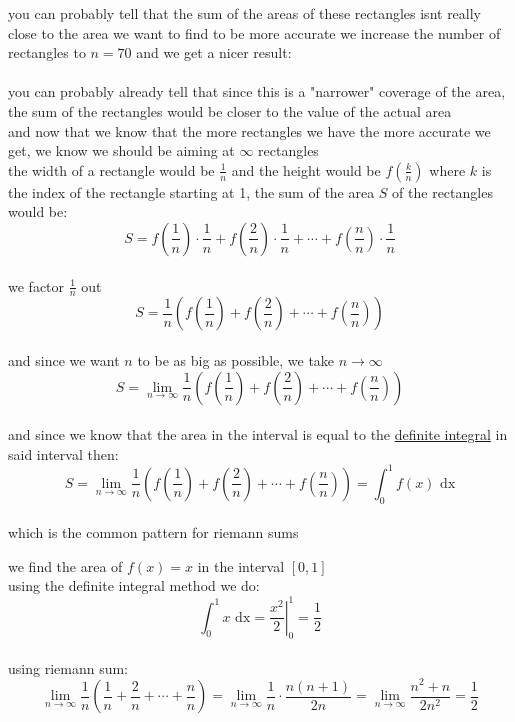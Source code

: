 \documentclass[a4paper,12pt]{article}
\newcommand{\?}{\stackrel{?}{=}}
\begin{document}
you can probably tell that the sum of the areas of these rectangles isnt really close to the area we want to find to be more accurate we increase the number of rectangles to \(n=70\) and we get a nicer result:\\[0pt]

\\[0pt]

you can probably already tell that since this is a "narrower" coverage of the area, the sum of the rectangles would be closer to the value of the actual area\\[0pt]
and now that we know that the more rectangles we have the more accurate we get, we know we should be aiming at \(\infty\) rectangles\\[0pt]
the width of a rectangle would be \(\frac{1}{n}\) and the height would be \(f\left(\frac{k}{n}\right)\) where \(k\) is the index of the rectangle starting at 1, the sum of the area \(S\) of the rectangles would be:\\[0pt]
\[
  S = f\left(\frac{1}{n}\right) \cdot \frac{1}{n} + f\left(\frac{2}{n}\right) \cdot \frac{1}{n} + \cdots + f\left(\frac{n}{n}\right) \cdot \frac{1}{n}
\]\\[0pt]
we factor \(\frac{1}{n}\) out\\[0pt]
\[
  S = \frac{1}{n} \left(f\left(\frac{1}{n}\right) + f\left(\frac{2}{n}\right) + \cdots + f\left(\frac{n}{n}\right)\right)
\]\\[0pt]
and since we want \(n\) to be as big as possible, we take \(n \to \infty\)\\[0pt]
\[
  S = \lim_{n\to\infty} \frac{1}{n} \left(f\left(\frac{1}{n}\right) + f\left(\frac{2}{n}\right) + \cdots + f\left(\frac{n}{n}\right)\right)
\]\\[0pt]
and since we know that the area in the interval is equal to the \hyperref[sec:orgb402e53]{definite integral} in said interval then:\\[0pt]
\[
  S = \lim_{n\to\infty} \frac{1}{n} \left(f\left(\frac{1}{n}\right) + f\left(\frac{2}{n}\right) + \cdots + f\left(\frac{n}{n}\right)\right) = \int_{0}^{1} f(x) \text{ dx}
\]\\[0pt]
which is the common pattern for riemann sums\\[0pt]

\begin{my_example}
we find the area of \(f(x)=x\) in the interval \([0,1]\)\\[0pt]
using the definite integral method we do:\\[0pt]
\[
 \int_{0}^{1} x \text{ dx} = \left. \frac{x^2}{2} \right\vert_0^1 = \frac12
\]\\[0pt]
using riemann sum:\\[0pt]
\[
 \lim_{n\to\infty} \frac{1}{n} \left(\frac{1}{n} + \frac{2}{n} + \cdots + \frac{n}{n}\right) = \lim_{n\to\infty} \frac1n \cdot \frac{n(n+1)}{2n} = \lim_{n\to\infty} \frac{n^2+n}{2n^2} = \frac12
\]\\[0pt]
\end{my_example}
\end{document}
